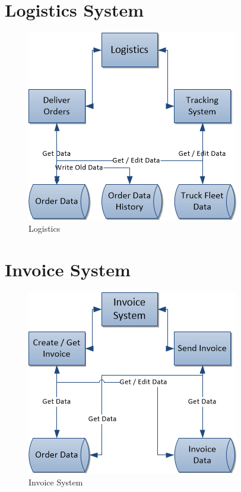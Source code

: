 \documentclass[11pt,a4paper,oneside,svgnames]{report}
\begin{document}
\section{Logistics System}

\begin{figure}[H]
 \begin{center}
  \includegraphics[width=\textwidth]{Logistics.png}
 \end{center}
 \caption{Logistics}
\end{figure}

\section{Invoice System}

\begin{figure}[H]
 \begin{center}
  \includegraphics[width=\textwidth]{InvoiceSystem.png}
 \end{center}
 \caption{Invoice System}
\end{figure}
\end{document}
